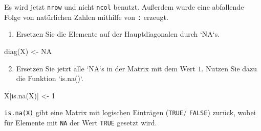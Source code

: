 \documentclass[12pt,a4paper]{article}
\newenvironment{Shaded}{\begin{snugshade}}{\end{snugshade}}
\newcommand{\ConstantTok}[1]{\textcolor[rgb]{0.00,0.00,0.00}{#1}}
\newcommand{\DecValTok}[1]{\textcolor[rgb]{0.00,0.00,0.81}{#1}}
\newcommand{\FunctionTok}[1]{\textcolor[rgb]{0.00,0.00,0.00}{#1}}
\newcommand{\NormalTok}[1]{#1}
\newcommand{\OtherTok}[1]{\textcolor[rgb]{0.56,0.35,0.01}{#1}}
\begin{document}
Es wird jetzt \texttt{nrow} und nicht \texttt{ncol} benutzt. Außerdem
wurde eine abfallende Folge von natürlichen Zahlen mithilfe von
\texttt{:} erzeugt.

\begin{enumerate} 
  \item Ersetzen Sie die Elemente auf der Hauptdiagonalen durch `NA`s. 
\end{enumerate}

\begin{Shaded}
\begin{Highlighting}[]
    \FunctionTok{diag}\NormalTok{(X) }\OtherTok{\textless{}{-}} \ConstantTok{NA}
\end{Highlighting}
\end{Shaded}

\begin{enumerate} \setcounter{enumi}{1}
  \item Ersetzen Sie jetzt alle `NA`s in der Matrix mit dem Wert $1$. Nutzen Sie dazu die Funktion `is.na()`.
\end{enumerate}

\begin{Shaded}
\begin{Highlighting}[]
\NormalTok{    X[}\FunctionTok{is.na}\NormalTok{(X)] }\OtherTok{\textless{}{-}} \DecValTok{1}
\end{Highlighting}
\end{Shaded}

\texttt{is.na(X)} gibt eine Matrix mit logischen Einträgen
(\texttt{TRUE}/ \texttt{FALSE}) zurück, wobei für Elemente mit
\texttt{NA} der Wert \texttt{TRUE} gesetzt wird.
\end{document}
